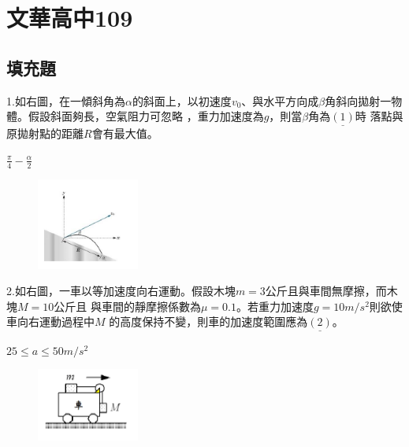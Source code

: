 \documentclass[cn,10pt,math=newtx,chinesefont=founder,device=ig]{elegantbook}
\begin{document}
\chapter{文華高中109}
\section{填充題}

\begin{example}
   1.如右圖，在一傾斜角為$\alpha$的斜面上，以初速度$v_0$、與水平方向成$\beta$角斜向拋射一物體。假設斜面夠長，空氣阻力可忽略 ，重力加速度為$g$，則當$\beta$角為$\underline{  (1)  }$時 落點與原拋射點的距離$R$會有最大值。\\
    \rightline{[文華高中教甄109]}
\end{example}
\begin{solution}
    $\frac{\pi} {4}-\frac{\alpha} {2}$
\end{solution}
\begin{figure}[htbp]
    \flushright
    \includegraphics[width=0.3\textwidth]{image/109文華1.png}
  \end{figure}
\newpage


\begin{example}
   2.如右圖，一車以等加速度向右運動。假設木塊$m=3$公斤且與車間無摩擦，而木塊$ M =10 公斤$且 與車間的靜摩擦係數為$\mu=0.1$。若重力加速度$g=10m/s^2$則欲使車向右運動過程中$M$ 的高度保持不變，則車的加速度範圍應為$\underline{(2)}$。
   \\
    \rightline{[文華高中教甄109]}
\end{example}
\begin{solution}
    $25\le a \le 50  m/s^2 $
\end{solution}
\begin{figure}[htbp]
    \flushright
    \includegraphics[width=0.3\textwidth]{image/109文華2.png}
  \end{figure}
\newpage
\end{document}
